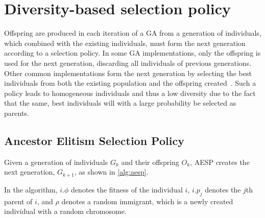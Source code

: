 \section{Diversity-based selection policy}
Offspring are produced in each iteration of a GA from a generation of individuals, which combined with the existing individuals, must form the next generation according to a selection policy. In some GA implementations, only the offspring is used for the next generation, discarding all individuals of previous generations. Other common implementations form the next generation by selecting the best individuals from both the existing population and the offspring created~\cite{masterThesisGANN}. Such a policy leads to homogeneous individuals and thus a low diversity due to the fact that the same, best individuals will with a large probability be selected as parents.

\subsection{Ancestor Elitism Selection Policy}
Given a generation of individuals $G_k$ and their offspring $O_k$, AESP creates the next generation, $G_{k+1}$, as shown in \cref{alg:aesp}.
%

%
In the algorithm, $i.\phi$ denotes the fitness of the individual $i$, $i.p_j$ denotes the $j$th parent of $i$, and $\rho$ denotes a random immigrant, which is a newly created individual with a random chromosome.
